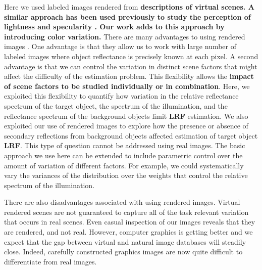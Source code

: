 \documentclass{jov}
\providecommand{\DIFaddtex}[1]{{\bf #1}} %
\providecommand{\DIFdeltex}[1]{} %
\providecommand{\DIFaddbegin}{} %
\providecommand{\DIFaddend}{} %
\providecommand{\DIFdelbegin}{} %
\providecommand{\DIFdelend}{} %
\providecommand{\DIFadd}[1]{\texorpdfstring{\DIFaddtex{#1}}{#1}} %
\providecommand{\DIFdel}[1]{\texorpdfstring{\DIFdeltex{#1}}{}} %
\newcommand{\DIFscaledelfig}{0.5}
\newlength{\DIFdelgraphicswidth} %
\newlength{\DIFdelgraphicsheight} %
\newcommand{\DIFaddincludegraphics}[2][]{{\color{blue}\fbox{\DIFOincludegraphics[#1]{#2}}}} %
\newcommand{\DIFdelincludegraphics}[2][]{%
\sbox{\DIFdelgraphicsbox}{\DIFOincludegraphics[#1]{#2}}%
\settoboxwidth{\DIFdelgraphicswidth}{\DIFdelgraphicsbox} %
\settoboxtotalheight{\DIFdelgraphicsheight}{\DIFdelgraphicsbox} %
\scalebox{\DIFscaledelfig}{%
\parbox[b]{\DIFdelgraphicswidth}{\usebox{\DIFdelgraphicsbox}\\[-\baselineskip] \rule{\DIFdelgraphicswidth}{0em}}\llap{\resizebox{\DIFdelgraphicswidth}{\DIFdelgraphicsheight}{%
\setlength{\unitlength}{\DIFdelgraphicswidth}%
\begin{picture}(1,1)%
\thicklines\linethickness{2pt} %
{\color[rgb]{1,0,0}\put(0,0){\framebox(1,1){}}}%
{\color[rgb]{1,0,0}\put(0,0){\line( 1,1){1}}}%
{\color[rgb]{1,0,0}\put(0,1){\line(1,-1){1}}}%
\end{picture}%
}\hspace*{3pt}}} %
} %
\DeclareRobustCommand{\DIFaddbegin}{\DIFOaddbegin \let\includegraphics\DIFaddincludegraphics} %
\DeclareRobustCommand{\DIFaddend}{\DIFOaddend \let\includegraphics\DIFOincludegraphics} %
\DeclareRobustCommand{\DIFdelbegin}{\DIFOdelbegin \let\includegraphics\DIFdelincludegraphics} %
\DeclareRobustCommand{\DIFdelend}{\DIFOaddend \let\includegraphics\DIFOincludegraphics} %
\begin{document}
Here we used labeled images rendered from \DIFdelbegin \DIFdel{virtual scene descriptions . 
}\DIFdelend \DIFaddbegin \DIFadd{descriptions of virtual scenes. 
A similar approach has been used previously to study the perception of lightness and specularity \cite{toscani2013optimal,wiebel2015statistical,toscani2017lightness}. 
Our work adds to this approach by introducing color variation. 
}\DIFaddend There are many advantages to using rendered images \cite{Butler:ECCV:2012}. 
One advantage is that they allow us to work with large number of labeled images where object reflectance is precisely known at each pixel. A second advantage is that we can control the variation in distinct scene factors that might affect the difficulty of the estimation problem. This flexibility allows the \DIFdelbegin \DIFdel{study of individual scene factors as well as their combined effects}\DIFdelend \DIFaddbegin \DIFadd{impact of scene factors to be studied individually or in combination}\DIFaddend . Here, we exploited this flexibility to quantify how variation in the relative reflectance spectrum of the target object, the spectrum of the illumination, and the reflectance spectrum of the background objects limit \DIFdelbegin \DIFdel{LRV }\DIFdelend \DIFaddbegin \DIFadd{LRF }\DIFaddend estimation. We also exploited our use of rendered images to explore how the presence or absence of secondary reflections from background objects affected estimation of target object \DIFdelbegin \DIFdel{LRV}\DIFdelend \DIFaddbegin \DIFadd{LRF}\DIFaddend . This type of question cannot be addressed using real images. The basic approach we use here can be extended to include parametric control over the amount of variation of different factors. For example, we could systematically vary the variances of the distribution over the weights that control the relative spectrum of the illumination.

There are also disadvantages associated with using rendered images. 
Virtual rendered scenes are not guaranteed to capture all of the task relevant variation that occurs in real scenes.
Even casual inspection of our images reveals that they are rendered, and not real.
However, computer graphics is getting better and we expect that the gap between virtual and natural image databases will steadily close.
Indeed, carefully constructed graphics images are now quite difficult to differentiate from real images.
\end{document}
